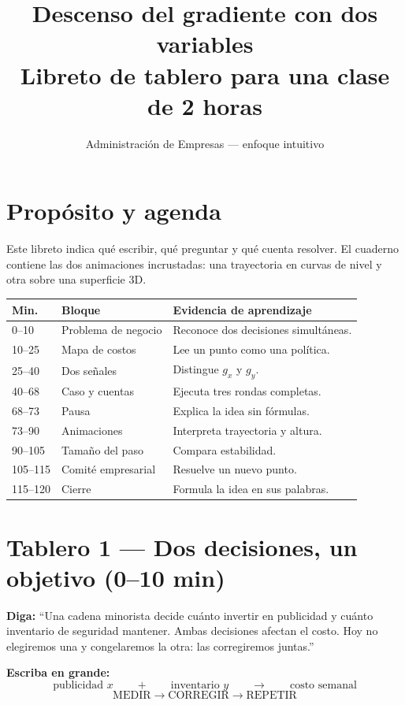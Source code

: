 \documentclass[11pt]{article}
\title{\textbf{Descenso del gradiente con dos variables}\\[.3em]\large Libreto de tablero para una clase de 2 horas}
\author{Administración de Empresas --- enfoque intuitivo}
\date{}
\begin{document}
\maketitle

\section*{Propósito y agenda}
Este libreto indica qué escribir, qué preguntar y qué cuenta resolver. El cuaderno
contiene las dos animaciones incrustadas: una trayectoria en curvas de nivel y otra
sobre una superficie 3D.

\begin{center}
\begin{tabular}{p{1.5cm}p{5cm}p{6.3cm}}
\toprule
Min. & Bloque & Evidencia de aprendizaje\\
\midrule
0--10 & Problema de negocio & Reconoce dos decisiones simultáneas.\\
10--25 & Mapa de costos & Lee un punto como una política.\\
25--40 & Dos señales & Distingue $g_x$ y $g_y$.\\
40--68 & Caso y cuentas & Ejecuta tres rondas completas.\\
68--73 & Pausa & Explica la idea sin fórmulas.\\
73--90 & Animaciones & Interpreta trayectoria y altura.\\
90--105 & Tamaño del paso & Compara estabilidad.\\
105--115 & Comité empresarial & Resuelve un nuevo punto.\\
115--120 & Cierre & Formula la idea en sus palabras.\\
\bottomrule
\end{tabular}
\end{center}

\newpage
\section*{Tablero 1 --- Dos decisiones, un objetivo (0--10 min)}
\textbf{Diga:} ``Una cadena minorista decide cuánto invertir en publicidad y cuánto
inventario de seguridad mantener. Ambas decisiones afectan el costo. Hoy no elegiremos
una y congelaremos la otra: las corregiremos juntas.''

\textbf{Escriba en grande:}
\[
\boxed{\text{publicidad }x\qquad+\qquad\text{inventario }y
\qquad\longrightarrow\qquad\text{costo semanal}}
\]
\[
\boxed{\text{MEDIR}\longrightarrow\text{CORREGIR}\longrightarrow\text{REPETIR}}
\]
\end{document}

